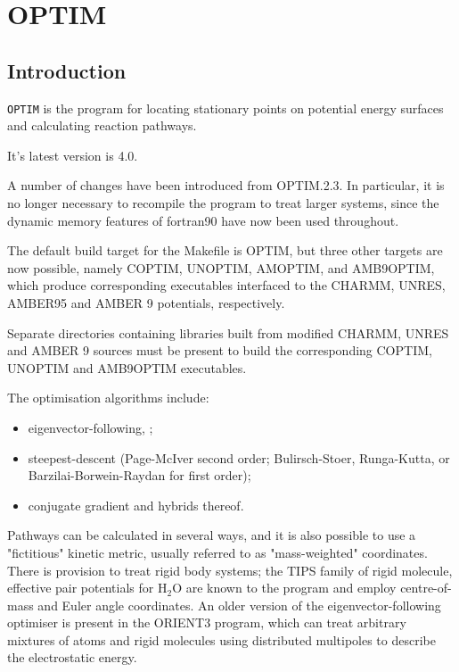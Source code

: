 \chapter{OPTIM}
\renewcommand{\pname}{OPTIM}

\section{Introduction}
\label{sec:intro}

{\tt OPTIM} is the program for 
locating stationary points on potential energy 
surfaces and calculating reaction pathways. \cite{Wales03}

It's latest version is 4.0.

A number of changes have been introduced from OPTIM.2.3.
In particular, it is no longer necessary to recompile the program to treat larger systems, since
the dynamic memory features of fortran90 have now been used throughout.

The default build target for the Makefile is OPTIM, but three other targets are now
possible, namely COPTIM, UNOPTIM, AMOPTIM, and AMB9OPTIM, which produce corresponding executables interfaced 
to the CHARMM,\cite{mackerellbbdeffgghjkklmmnnprrsssswwyk98,lazaridisk99}
UNRES, AMBER95\cite{cornellcbgmfsfck95} and AMBER 9 potentials, respectively.

Separate directories containing libraries built from modified CHARMM, UNRES and AMBER 9 sources must 
be present to build the corresponding COPTIM, UNOPTIM and AMB9OPTIM executables.

The optimisation algorithms include:
\begin{itemize}
  \item eigenvector-following,
\cite{Pancir74,cerjanm81,simonsjto83,onealts84,banerjeeass85,baker86,baker87};
\item steepest-descent (Page-McIver second order; Bulirsch-Stoer, Runga-Kutta, or 
Barzilai-Borwein-Raydan\cite{BB-IMAJNA-1988,Raydan-SIAMJO-1997} for first order);
\item conjugate gradient and hybrids thereof.
\end{itemize}

Pathways can be calculated in several ways, and it is also possible to
use a "fictitious" kinetic metric,
usually referred to as "mass-weighted" coordinates.
There is provision to treat rigid body systems; the
TIPS family of rigid molecule, effective pair potentials for H$_2$O are known to
the program and employ centre-of-mass and Euler angle coordinates. An older
version of the eigenvector-following optimiser is present in the ORIENT3 program, which can treat 
arbitrary mixtures of atoms and rigid molecules using distributed multipoles to
describe the electrostatic energy.\cite{stone81,stonea85}\

